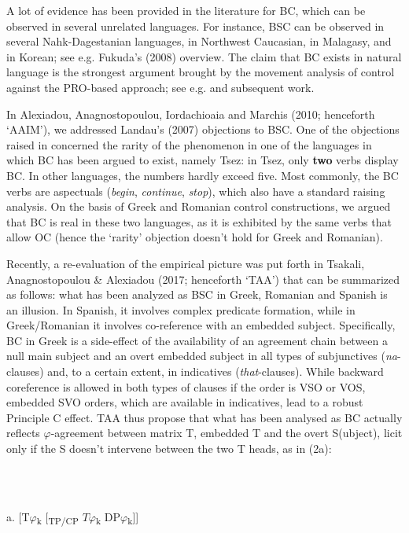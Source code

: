 \documentclass[output=paper]{langsci/langscibook}
\begin{document}
A lot of evidence has been provided in the literature for BC, which can be observed in several unrelated languages. For instance, BSC can be observed in several Nahk-Dagestanian languages, in Northwest Caucasian, in Malagasy, and in Korean; see e.g. Fukuda’s (2008) overview. The claim that BC exists in natural language is the strongest argument brought by the movement analysis of control against the PRO-based approach; see e.g. \citet{Landau1999} and subsequent work.

  In Alexiadou, Anagnostopoulou, Iordachioaia and Marchis (2010; henceforth ‘AAIM’), we addressed Landau’s (2007) objections to BSC. One of the objections raised in \citet{Landau2007} concerned the rarity of the phenomenon in one of the languages in which BC has been argued to exist, namely Tsez: in Tsez, only \textbf{two} verbs display BC. In other languages, the numbers hardly exceed five. Most commonly, the BC verbs are aspectuals (\textit{begin}, \textit{continue}, \textit{stop}), which also have a standard raising analysis. On the basis of Greek and Romanian control constructions, we argued that BC is real in these two languages, as it is exhibited by the same verbs that allow OC (hence the ‘rarity’ objection doesn’t hold for Greek and Romanian). 

Recently, a re-evaluation of the empirical picture was put forth in Tsakali, Anagnostopoulou \& Alexiadou (2017; henceforth ‘TAA’) that can be summarized as follows: what has been analyzed as BSC in Greek, Romanian and Spanish is an illusion. In Spanish, it involves complex predicate formation, while in Greek/Romanian it involves co-reference with an embedded subject. Specifically, BC in Greek is a side-effect of the availability of an agreement chain between a null main subject and an overt embedded subject in all types of subjunctives (\textit{na}{}-clauses) and, to a certain extent, in indicatives (\textit{that}{}-clauses). While backward coreference is allowed in both types of clauses if the order is VSO or VOS, embedded SVO orders, which are available in indicatives, lead to a robust Principle C effect. TAA thus propose that what has been analysed as BC actually reflects $\varphi ${}-agreement between matrix T, embedded T and the overt S(ubject), licit only if the S doesn’t intervene between the two T heads, as in (2a):

\ea%
    \label{ex:key:2}
    \gll\\
        \\
    \glt
    \z

           a.  [T$\varphi $\textsubscript{k} [\textsubscript{TP/CP} $T\varphi $\textsubscript{k} DP$\varphi $\textsubscript{k}]]      
\end{document}
